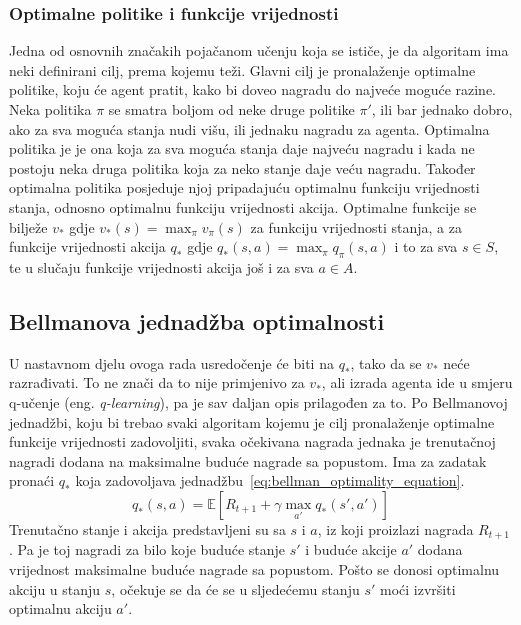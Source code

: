 \subsubsection{Optimalne politike i funkcije vrijednosti}
Jedna od osnovnih značakih pojačanom učenju koja se ističe, je da algoritam ima neki definirani cilj, prema kojemu teži. Glavni cilj je pronalaženje optimalne politike, koju će agent pratit, kako bi doveo nagradu do najveće moguće razine. Neka politika $\pi$ se smatra boljom od neke druge politike $\pi'$, ili bar jednako dobro, ako za sva moguća stanja nudi višu, ili jednaku nagradu za agenta. Optimalna politika je je ona koja za sva moguća stanja daje najveću nagradu i kada ne postoju neka druga politika koja za neko stanje daje veću nagradu. Također optimalna politika posjeduje njoj pripadajuću optimalnu funkciju vrijednosti stanja, odnosno optimalnu funkciju vrijednosti akcija. Optimalne funkcije se bilježe $v_*$ gdje $v_*(s) = \max_\pi v_\pi(s)$ za funkciju vrijednosti stanja, a za funkcije vrijednosti akcija $q_*$ gdje $q_*(s, a) = \max_\pi q_\pi(s, a)$ i to za sva $s \in S$, te u slučaju funkcije vrijednosti akcija još i za sva $a \in A$.

\subsection{Bellmanova jednadžba optimalnosti}
U nastavnom djelu ovoga rada usredočenje će biti na $q_*$, tako da se $v_*$ neće razrađivati. To ne znači da to nije primjenivo za $v_*$, ali izrada agenta ide u smjeru q-učenje (eng. \textit{q-learning}), pa je sav daljan opis prilagođen za to. 
Po Bellmanovoj jednadžbi, koju bi trebao svaki algoritam kojemu je cilj pronalaženje optimalne funkcije vrijednosti zadovoljiti, svaka očekivana nagrada jednaka je trenutačnoj nagradi dodana na maksimalne buduće nagrade sa popustom. Ima za zadatak pronaći $q_*$ koja zadovoljava jednadžbu~\ref{eq:bellman_optimality_equation}.
\begin{equation}\label{eq:bellman_optimality_equation}
q_*(s, a) = \mathbb{E}\left[R_{t+1} + \gamma\max_{a'}q_*(s', a')\right]
\end{equation}
Trenutačno stanje i akcija predstavljeni su sa $s$ i $a$, iz koji proizlazi nagrada $R_{t+1}$. Pa je toj nagradi za bilo koje buduće stanje $s'$ i buduće akcije $a'$ dodana vrijednost maksimalne buduće nagrade sa popustom. Pošto se donosi optimalnu akciju u stanju $s$, očekuje se da će se u sljedećemu stanju $s'$ moći izvršiti optimalnu akciju $a'$.

